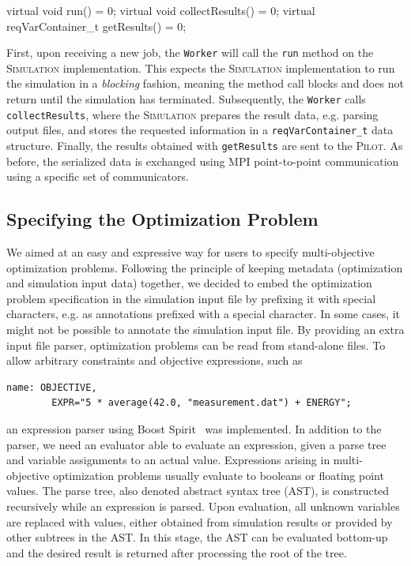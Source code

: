 \documentclass[preprint,linenumbers,amsmath,amssymb,aps,prstab]{revtex4-1}%
\begin{document}
\begin{code}
virtual void run() = 0;
virtual void collectResults() = 0;
virtual reqVarContainer_t getResults() = 0;
\end{code}

First, upon receiving a new job, the \texttt{Worker} will call the \texttt{run} 
method on the \textsc{Simulation} implementation.
This expects the \textsc{Simulation} implementation to run the simulation in a 
\textit{blocking} fashion, meaning the method call blocks and does not return
until the simulation has terminated.
Subsequently, the \texttt{Worker} calls \texttt{collectResults}, where the
\textsc{Simulation} prepares the result data, e.g. parsing output files,
and stores the requested information in a \texttt{reqVarContainer\_t} data structure.
Finally, the results obtained with \texttt{getResults} are sent to the \textsc{Pilot}. 
As before, the serialized data is exchanged using MPI point-to-point communication using a specific set of communicators.


\subsection{Specifying the Optimization Problem}

We aimed at an easy and expressive way for users to specify multi-objective optimization problems.
Following the principle of keeping metadata (optimization and simulation input data) together, 
we decided to embed the optimization problem specification in the simulation input file by 
prefixing it with special characters, e.g. as annotations prefixed with a special character.
In some cases, it might not be possible to annotate the simulation input file.
By providing an extra input file parser, optimization problems can be read from stand-alone files.
To allow arbitrary constraints and objective expressions, such as
%
\begin{Verbatim}[fontsize=\scriptsize]
  name: OBJECTIVE,
        EXPR="5 * average(42.0, "measurement.dat") + ENERGY";
\end{Verbatim}
%
\noindent
an expression parser using Boost Spirit~\cite{boost} was implemented.
In addition to the parser, we need an evaluator able to evaluate an expression,
given a parse tree and variable assignments to an actual value.
Expressions arising in multi-objective optimization problems usually evaluate
to booleans or floating point values.
The parse tree, also denoted abstract syntax tree (AST), is constructed recursively while an expression is parsed.
Upon evaluation, all unknown variables are replaced with values, 
either obtained from simulation results or provided by other subtrees in the AST.
In this stage, the AST can be evaluated bottom-up and the desired result is
  returned after processing the root of the tree.
\end{document}
